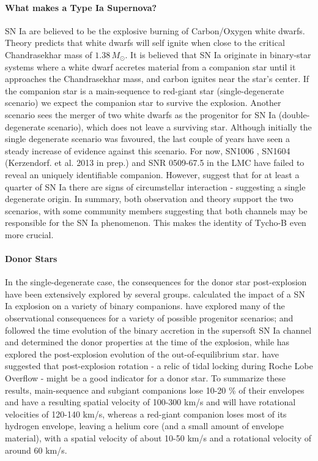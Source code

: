 \documentclass[12pt]{article}
\begin{document}
\vspace{-5mm}
\paragraph{What makes a Type Ia Supernova?}
SN Ia are believed to be the explosive burning of Carbon/Oxygen white dwarfs. Theory predicts that white dwarfs will self ignite when close to the critical Chandrasekhar mass of  $1.38\,M_\odot$. 
It is believed that SN Ia originate in binary-star systems where a white dwarf accretes material from a companion star until it approaches the Chandrasekhar mass, and carbon ignites near the star's center. If the companion star is a main-sequence to red-giant star (single-degenerate scenario) we expect the companion star to survive the explosion. Another scenario sees the merger of two white dwarfs as the progenitor for SN Ia (double-degenerate scenario), which does not leave a surviving star. 
Although initially the single degenerate scenario was favoured, the last couple of years have seen a steady increase of evidence against this scenario. For now, SN1006 \citep{2012Natur.489..533G,2012ApJ...759....7K}, SN1604 (Kerzendorf. et al. 2013 in prep.) and SNR 0509-67.5 in the LMC \citep{2012Natur.481..164S} have failed to reveal an uniquely identifiable companion. However, \citet{2011Sci...333..856S, 2007Sci...317..924P, 2012arXiv1203.2916F} suggest that for at least a quarter of SN Ia there are signs of circumstellar interaction - suggesting a single degenerate origin. In summary, both observation and theory support the two scenarios, with some community members suggesting that both channels may be responsible for the SN Ia phenomenon. This makes the identity of Tycho-B even more crucial.


\vspace{-5mm}
\paragraph{Donor Stars}
In the single-degenerate case, the consequences for the donor star post-explosion have been extensively explored by several groups. \citet{2000ApJS..128..615M} calculated the impact of a SN Ia explosion on a variety of binary companions. \citet{2001ApJ...550L..53C} have explored many of the observational consequences for a variety of possible progenitor scenarios; \citet{2004MNRAS.350.1301H} and \citet{Han:2008p726} followed the time evolution of the binary accretion in the supersoft SN Ia channel and determined the donor properties at the time of the explosion, while \citet{2003astro.ph..3660P} has explored the post-explosion evolution of the out-of-equilibrium star. \citet{2009ApJ...701.1665K} have suggested that post-explosion rotation - a relic of tidal locking during Roche Lobe Overflow - might be a good indicator for a donor star. 
To summarize these results, main-sequence and subgiant companions lose 10-20 \% of their envelopes and have a resulting spatial velocity of 100-300 km/s and will have rotational velocities of 120-140 km/s, whereas a red-giant companion loses most of its hydrogen envelope, leaving a helium core (and a small amount of envelope material), with a spatial velocity of about 10-50 km/s and a rotational velocity of around 60 km/s.
\end{document}
